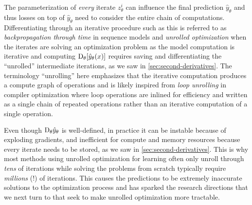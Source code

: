 \documentclass[twoside,11pt]{article}
\begin{document}
The parameterization of \emph{every} iterate $z_\theta^i$ can
influence the final prediction $\hat y_\theta$ and thus
losses on top of $\hat y_\theta$ need to consider the
entire chain of computations.
Differentiating through an iterative procedure such
as this is referred to as \emph{backpropagation through time}
in sequence models and \emph{unrolled optimization}
\citep{pearlmutter2008reverse,zhang2010multi,maclaurin2015gradient,belanger2016structured,metz2016unrolled,finn2017model,han2017alternating,belanger2017end,belanger2017deep,foerster2017learning,bhardwaj2020differentiable,monga2021algorithm}
when the iterates are solving an optimization problem
as the model computation is iterative and computing
$\mathrm{D}_\theta[\hat y_\theta(x)]$
requires saving and differentiating the ``unrolled''
intermediate iterations, as we saw in \cref{sec:second-derivatives}.
The terminology ``unrolling'' here emphasizes that the
iterative computation produces a compute graph of operations
and is likely inspired from
\emph{loop unrolling} in compiler optimization
\citep{aho1986compilers,davidson1995aggressive} where
loop operations are inlined for efficiency and written
as a single chain of repeated operations rather
than an iterative computation of a single operation.

Even though $\mathrm{D}_\theta \hat y_\theta$ is well-defined,
in practice it can be
instable because of exploding gradients,
and inefficient for compute and memory resources because
every iterate needs to be stored,
as we saw in \cref{sec:second-derivatives}.
This is why most methods using unrolled optimization for learning
often only unroll through \emph{tens} of iterations
\citep{metz2016unrolled,belanger2017end,foerster2017learning,finn2017model}
while solving the problems from scratch typically
require \emph{millions} (!) of iterations.
This causes the predictions to be extremely inaccurate solutions
to the optimization process and has sparked the research directions
that we next turn to that seek to make unrolled optimization
more tractable.
\end{document}
